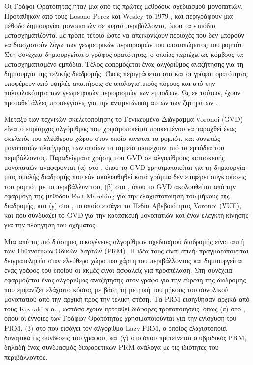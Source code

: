 Οι Γράφοι Ορατότητας ήταν μία από τις πρώτες μεθόδους σχεδιασμού μονοπατιών.
Προτάθηκαν από τους Losano-Perez και Wesley το 1979 \cite{Lozano-Perez1979},
και περιγράφουν μια μέθοδο δημιουργίας μονοπατιών σε κυρτά περιβάλλοντα, όπου
τα εμπόδια μετασχηματίζονται με τρόπο τέτοιο ώστε να απεικονίζουν περιοχές που
δεν μπορούν να διασχιστούν λόγω των γεωμετρικών περιορισμών του αποτυπώματος
του ρομπότ. Στη συνέχεια δημιουργείται ο γράφος ορατότητας, ο οποίος περιέχει
ως κόμβους τα μετασχηματισμένα εμπόδια. Τέλος εφαρμόζεται ένας αλγόριθμος
αναζήτησης για τη δημιουργία της τελικής διαδρομής. Όπως περιγράφεται στα
\cite{Ghosh2007} και \cite{Ghosh2013} οι γράφοι ορατότητας υποφέρουν από υψηλές
απαιτήσεις σε υπολογιστικούς πόρους και από την πολυπλοκότητα των γεωμετρικών
περιορισμών των εμποδίων. Ως εκ τούτων, έχουν προταθεί άλλες προσεγγίσεις για
την αντιμετώπιση αυτών των ζητημάτων \cite{Kim2011}.

Μεταξύ των τεχνικών σκελετοποίησης το Γενικευμένο Διάγραμμα Voronoi (GVD) είναι
ο κυρίαρχος αλγόριθμος που χρησιμοποιείται προκειμένου να παραχθεί ένας
σκελετός του ελεύθερου χώρου στον οποίο κινείται το ρομπότ, και συνεπώς
μονοπατιών πλοήγησης των οποίων τα σημεία ισαπέχουν από τα εμπόδια του
περιβάλλοντος. Παραδείγματα χρήσης του GVD σε αλγορίθμους κατασκευής μονοπατιών
αναφέρονται (α) στο \cite{Bhattacharya2007}, όπου το GVD χρησιμοποιείται για τη
δημιουργία μιας ομαλής διαδρομής που εάν ακολουθηθεί κατά γράμμα δεν επιφέρει
συγκρούσεις του ρομπότ με το περιβάλλον του, (β) στο \cite{Garrido2006}, όπου
το GVD ακολουθείται από την εφαρμογή της μεθόδου Fast Marching για την
ελαχιστοποίηση του μήκους της διαδρομής, και (γ) στο \cite{Ok2013}, το οποίο
εισάγει τα Πεδία Αβεβαιότητας Voronoi (VUF), και που συνδυάζει το GVD για την
κατασκευή μονοπατιών και έναν ελεγκτή κίνησης για την πλοήγηση του οχήματος.

Μια από τις πιό διάσημες οικογένειες αλγορίθμων σχεδιασμού διαδρομής είναι αυτή
των Πιθανοτικών Οδικών Χαρτών (PRM). Η ιδέα τους είναι απλή: πραγματοποιείται
δειγματοληψία στον ελεύθερο χώρο του χάρτη του περιβάλλοντος και δημιουργείται
ένας γράφος του οποίου οι ακμές είναι ασφαλείς για προσπέλαση. Στη συνέχεια
εφαρμόζεται ένας αλγόριθμος αναζήτησης στον γράφο για την εύρεση της διαδρομής
που εμφανίζει ελάχιστο κόστος με βάση τη μετρική του μήκους του συνολικού
μονοπατιού από την αρχική προς την τελική στάση. Τα PRM εισήχθησαν αρχικά από
τους Kavraki κ.α. \cite{Kavraki1996}, ωστόσο έχουν προταθεί διάφορες
τροποποιήσεις, όπως (α) στο \cite{Nissoux}, όπου οι έννοιες των Γράφων
Ορατότητας χρησιμοποιούνται για την ενίσχυση του PRM, (β) στο \cite{Bohlin2000}
που εισάγει τον αλγόριθμο Lazy PRM, ο οποίος ελαχιστοποιεί δυναμικά τις
συνδέσεις του γράφου, και (γ) στο \cite{Hsua} όπου προτείνεται ο υβριδικός PRM,
δηλαδή ένας συνδυασμός διαφορετικών PRM ανάλογα με τις ιδιότητες του
περιβάλλοντος.

